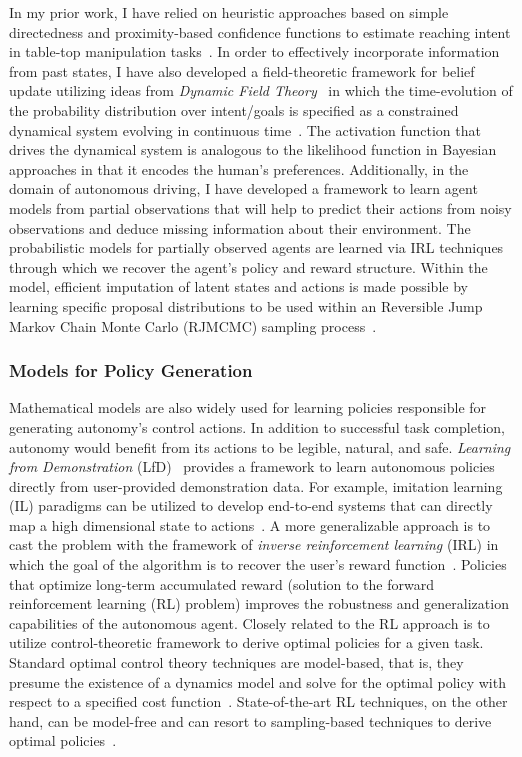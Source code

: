 \documentclass[12pt]{article}
\begin{document}
In my prior work, I have relied on heuristic approaches based on simple directedness and proximity-based confidence functions to estimate reaching intent in table-top manipulation tasks~\cite{gopinath2017human}. In order to effectively incorporate information from past states, I have also developed a field-theoretic framework for belief update utilizing ideas from \textit{Dynamic Field Theory}~\cite{schoner1995dynamics} in which the time-evolution of the probability distribution over intent/goals is specified as a constrained dynamical system evolving in continuous time~\cite{gopinathdynamic}. The activation function that drives the dynamical system is analogous to the likelihood function in Bayesian approaches in that it encodes the human's preferences. Additionally, in the domain of autonomous driving, I have developed a framework to learn agent models from partial observations that will help to predict their actions from noisy observations and deduce missing information about their environment. The probabilistic models for partially observed agents are learned via IRL techniques through which we recover the agent's policy and reward structure. Within the model, efficient imputation of latent states and actions is made possible by learning specific proposal distributions\cite{gu2015neural} to be used within an Reversible Jump Markov Chain Monte Carlo (RJMCMC) sampling process~\cite{green1995reversible}. 



\subsubsection{Models for Policy Generation}

Mathematical models are also widely used for learning policies responsible for generating autonomy's control actions. In addition to successful task completion, autonomy would benefit from its actions to be legible, natural, and safe. \textit{Learning from Demonstration} (LfD)~\cite{argall2009survey} provides a framework to learn autonomous policies directly from user-provided demonstration data. For example, imitation learning (IL) paradigms can be utilized to develop end-to-end systems that can directly map a high dimensional state to actions~\cite{bojarski2016end}. A more generalizable approach is to cast the problem with the framework of \textit{inverse reinforcement learning} (IRL) in which the goal of the algorithm is to recover the user's reward function~\cite{ziebart2008maximum}.  Policies that optimize long-term accumulated reward (solution to the forward reinforcement learning (RL) problem) improves the robustness and generalization capabilities of the autonomous agent. Closely related to the RL approach is to utilize control-theoretic framework to derive optimal policies for a given task. Standard optimal control theory techniques are model-based, that is, they presume the existence of a dynamics model and solve for the optimal policy with respect to a specified cost function~\cite{kirk1970optimal}. State-of-the-art RL techniques, on the other hand, can be model-free and can resort to sampling-based techniques to derive optimal policies~\cite{watkins1992q}. 
\end{document}
